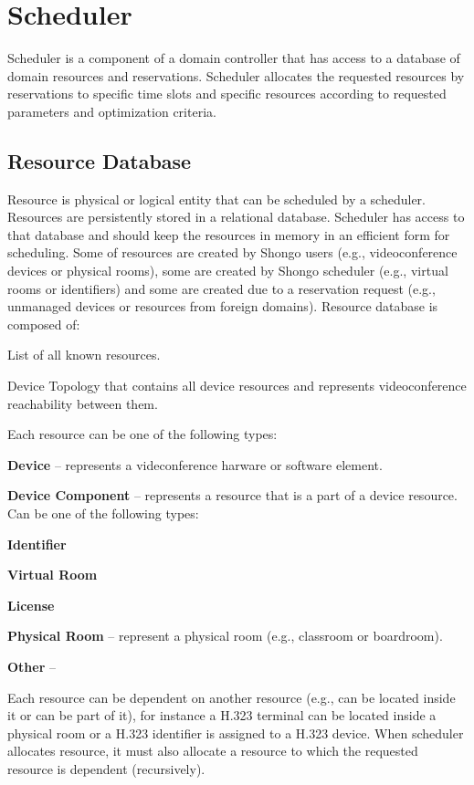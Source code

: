 \chapter{Scheduler}

Scheduler is a component of a domain controller that has access to a database 
of domain resources and reservations. Scheduler allocates the requested 
resources by reservations to specific time slots and specific resources 
according to requested parameters and optimization criteria.

\section{Resource Database}

Resource is physical or logical entity that can be scheduled by a scheduler. 
Resources are persistently stored in a relational database. Scheduler has 
access to that database and should keep the resources in memory in an 
efficient form for scheduling. Some of resources are created by Shongo users 
(e.g., videoconference devices or physical rooms), some are created by Shongo 
scheduler (e.g., virtual rooms or identifiers) and some are created due to a 
reservation request (e.g., unmanaged devices or resources from foreign 
domains). Resource database is composed of:
\begin{compactenum}
\item List of all known resources.
\item Device Topology that contains all device resources and represents 
videoconference reachability between them.
\end{compactenum}
Each resource can be one of the following types:
\begin{compactenum}
\item \textbf{Device} -- represents a videconference harware or software 
  element.
\item \textbf{Device Component} -- represents a resource that is a part of a 
  device resource. Can be one of the following types:
  \begin{compactenum}
    \item \textbf{Identifier}
    \item \textbf{Virtual Room}
    \item \textbf{License}
  \end{compactenum}
\item \textbf{Physical Room} -- represent a physical room (e.g., classroom or 
  boardroom).
\item \textbf{Other} -- 
\end{compactenum}
Each resource can be dependent on another resource (e.g., can be located 
inside it or can be part of it), for instance a H.323 terminal can be located 
inside a physical room or a H.323 identifier is assigned to a H.323 device. 
When scheduler allocates resource, it must also allocate a resource to which 
the requested resource is dependent (recursively).

